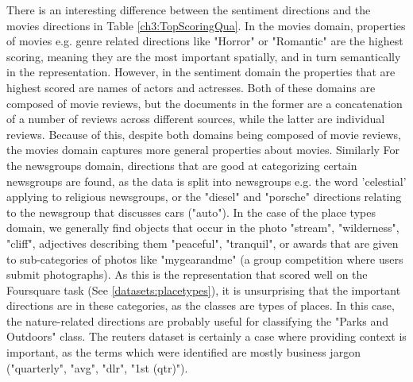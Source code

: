 There is an  interesting difference between the sentiment directions and the movies directions in Table \ref{ch3:TopScoringQua}. In the movies domain, properties of movies e.g. genre related directions like "Horror" or "Romantic" are the highest scoring, meaning they are the most important spatially, and in turn semantically in the representation. However, in the sentiment domain the properties that are highest scored are names of actors and actresses.  Both of these domains are composed of movie reviews, but the documents in the former are a concatenation of a number of reviews across different sources, while the latter are individual reviews. Because of this, despite both domains being composed of movie reviews, the movies domain captures more general properties about movies. Similarly For the newsgroups domain, directions  that are good at categorizing certain newsgroups are found, as the data is split into newsgroups e.g.  the word 'celestial' applying to religious newsgroups, or the "diesel" and "porsche" directions relating to the newsgroup that discusses cars ("auto"). In the case of the place types domain, we generally find objects that occur in the photo "stream", "wilderness", "cliff", adjectives describing them "peaceful", "tranquil", or  awards that are given to sub-categories of photos like "mygearandme" (a group competition where users submit photographs). As this is the representation that scored well on the Foursquare task (See \ref{datasets:placetypes}), it is unsurprising that the important directions are in these categories, as the classes are types of places. In this case, the nature-related directions are probably useful for classifying the "Parks and Outdoors" class. The reuters dataset is certainly a case where providing context is important, as the terms which were identified are  mostly business jargon ("quarterly", "avg", "dlr", "1st (qtr)"). 
